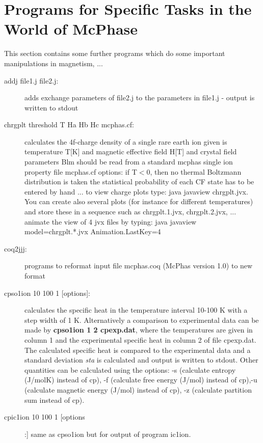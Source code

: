 \section{Programs for Specific Tasks in the World of McPhase}\label{addprog}

This section  contains some further programs which do some important manipulations
in magnetism, ...

\begin{description} 

\item [\prg addj file1.j file2.j:] adds exchange parameters of file2.j to the %
parameters in
file1.j - output is written to stdout

\item [\prg chrgplt threshold T Ha Hb Hc mcphas.cf:]
                calculates  the 4f-charge density of a single rare earth ion
                given is temperature T[K] and magnetic effective field H[T]
 		and crystal field  parameters Blm should be read from a 
	        standard mcphas single ion property file mcphas.cf 
                options: if T$<$0, then no thermal Boltzmann distribution
		 is taken
		the statistical probability of each CF state has to be 
		entered by hand ... to view charge plots type: java javaview chrgplt.jvx.
		You can create also several plots (for instance for different temperatures) and store %
these
		in a sequence such as chrgplt.1.jvx, chrgplt.2.jvx, ... animate
		the view of 4 jvx files by typing: java javaview model=chrgplt.*.jvx Animation.LastKey=4 

\item [\prg coq2jjj:]         programs to reformat input file {\prg mcphas.coq}
                      ({\prg McPhas} version 1.0) to new format

\item [\prg cpso1ion 10 100 1 {[options]}: ] calculates the specific heat in the temperature %
interval 10-100 K with a step width
of 1 K. Alternatively a comparison to experimental data can be made by {\bf cpso1ion 1 2 %
cpexp.dat},
where the temperatures are given in column 1 and the experimental specific heat in column
2 of file cpexp.dat. The calculated specific heat is compared to the experimental data and
a standard deviation {\em sta} is calculated and output is written to stdout.
Other quantities can be calculated using the options: -s  (calculate entropy  (J/molK) instead %
of cp),
-f (calculate free energy (J/mol) instead of cp),-u  (calculate magnetic energy (J/mol) instead %
of cp),
-z (calculate partition sum instead of cp).
\item[\prg cpic1ion 10 100 1 [options]:] same as {\prg cpso1ion} but for output of program
ic1ion.
					  

\end{description}
